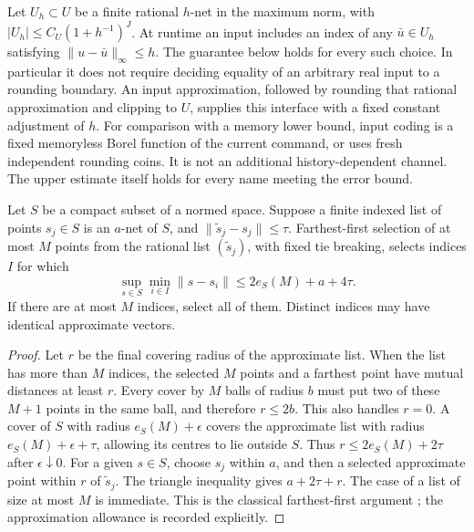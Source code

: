 Let $U_h\subset U$ be a finite rational $h$-net in the maximum norm,
with $|U_h|\le C_U(1+h^{-1})^J$. At runtime an input includes an index
of any $\bar u\in U_h$ satisfying $\|u-\bar u\|_\infty\le h$.
The guarantee below holds for every such choice. In particular it does
not require deciding equality of an arbitrary real input to a rounding
boundary. An input approximation, followed by rounding that rational
approximation and clipping to $U$, supplies this interface with a fixed
constant adjustment of $h$. For comparison with a memory lower bound,
input coding is a fixed memoryless Borel function of the current command,
or uses fresh independent rounding coins. It is not an additional
history-dependent channel. The upper estimate itself holds for every
name meeting the error bound.

\begin{lemma}\label{lem:finite-greedy}
Let $S$ be a compact subset of a normed space. Suppose a finite indexed
list of points $s_j\in S$ is an $a$-net of $S$, and
$\|\widetilde s_j-s_j\|\le\tau$. Farthest-first selection of at most
$M$ points from the rational list $(\widetilde s_j)$, with fixed tie
breaking, selects indices $I$ for which
\[
 \sup_{s\in S}\min_{i\in I}\|s-s_i\|
                 \le 2e_S(M)+a+4\tau.
\]
If there are at most $M$ indices, select all of them. Distinct indices
may have identical approximate vectors.
\end{lemma}
\begin{proof}
Let $r$ be the final covering radius of the approximate list. When the
list has more than $M$ indices, the selected $M$ points and a farthest
point have mutual distances at least $r$. Every cover by $M$ balls of
radius $b$ must put two of these $M+1$ points in the same ball, and
therefore $r\le2b$. This also handles $r=0$. A cover of $S$ with
radius $e_S(M)+\epsilon$ covers the approximate list with radius
$e_S(M)+\epsilon+\tau$, allowing its centres to lie outside $S$.
Thus $r\le2e_S(M)+2\tau$ after $\epsilon\downarrow0$.
For a given $s\in S$, choose $s_j$ within $a$, and then a selected
approximate point within $r$ of $\widetilde s_j$. The triangle
inequality gives $a+2\tau+r$. The case of a list of size at most $M$
is immediate. This is the classical farthest-first argument
\cite{Gonzalez}; the approximation allowance is recorded explicitly.
\end{proof}

